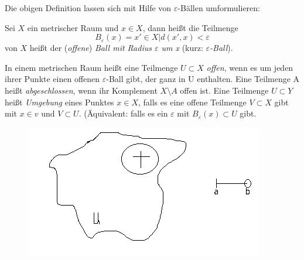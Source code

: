 \documentclass[a4paper,10pt]{scrartcl}
\newcommand{\eps}{\varepsilon}
\begin{document}
Die obigen Definition lassen sich mit Hilfe von $\eps$-Bällen umformulieren:
\begin{df}
Sei $X$ ein metrischer Raum und $x\in X$, dann heißt die Teilmenge 
\[
B_\eps(x)={x'\in X|d(x',x)<\eps}
\]
von $X$ heißt der (\emph{offene}) \emph{Ball mit Radius $\eps$ um x} (kurz: \emph{$\eps$-Ball}).
\end{df}
\begin{df}
In einem metrischen Raum heißt eine Teilmenge $U\subset X$ \emph{offen}, wenn es um jeden ihrer Punkte einen offenen $\eps$-Ball gibt, der ganz in U enthalten. Eine Teilmenge A heißt \emph{abgeschlossen}, wenn ihr Komplement $X\setminus A$ offen ist.  Eine Teilmenge $U \subset Y$ heißt \emph{Umgebung} eines Punktes $ x\in X$, falls es eine offene Teilmenge $V \subset X$ gibt mit $x\in v$ und $V \subset U$.  (Äquivalent: falls es ein $\eps$ mit $B_\eps(x)\subset U$ gibt.  
\end{df}

\begin{figure}[h]
\includegraphics[scale=0.5]{fig3.png}
\end{figure}
\end{document}
